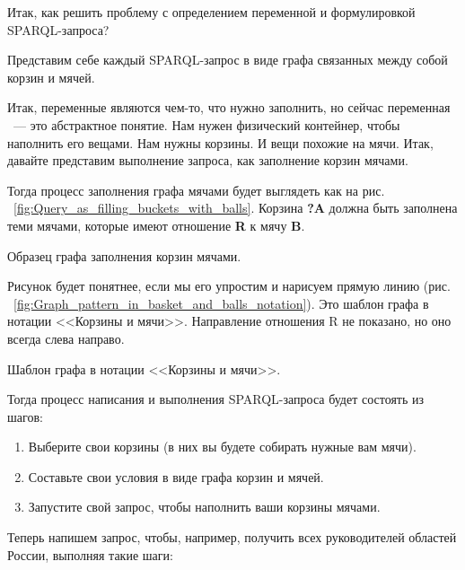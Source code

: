 Итак, как решить проблему с определением переменной и формулировкой SPARQL-запроса?

Представим себе каждый SPARQL-запрос в виде графа связанных между собой корзин и мячей.

Итак, переменные являются чем-то, что нужно заполнить, но сейчас переменная ~--- это абстрактное понятие. Нам нужен физический контейнер, чтобы наполнить его вещами. Нам нужны корзины. И вещи похожие на мячи. Итак, давайте представим выполнение запроса, как заполнение корзин мячами.

Тогда процесс заполнения графа мячами будет выглядеть как на рис. ~\ref{fig:Query_as_filling_buckets_with_balls}. Корзина \textbf{?A} должна быть заполнена теми мячами, которые имеют отношение \textbf{R} к мячу \textbf{B}.

\begin{marginfigure}[-3.5cm]
	{
		\setlength{\fboxsep}{0pt}%
		\setlength{\fboxrule}{1pt}%
	}
    \caption{Образец графа заполнения корзин мячами.}
	\label{fig:Query_as_filling_buckets_with_balls}
\end{marginfigure}

Рисунок будет понятнее, если мы его упростим и нарисуем прямую линию (рис. ~\ref{fig:Graph_pattern_in_basket_and_balls_notation}). Это шаблон графа в нотации <<Корзины и мячи>>. Направление отношения R не показано, но оно всегда слева направо.

\begin{marginfigure}[1.0cm]
	{
		\setlength{\fboxsep}{0pt}%
		\setlength{\fboxrule}{1pt}%
	}
    \caption{Шаблон графа в нотации <<Корзины и мячи>>.}
	\label{fig:Graph_pattern_in_basket_and_balls_notation}
\end{marginfigure}


Тогда процесс написания и выполнения SPARQL-запроса будет состоять из шагов:
\begin{enumerate}
    \item Выберите свои корзины (в них вы будете собирать нужные вам мячи).
    \item Составьте свои условия в виде графа корзин и мячей.
    \item Запустите свой запрос, чтобы наполнить ваши корзины мячами.
\end{enumerate}

Теперь напишем запрос, чтобы, например, получить всех руководителей областей России, выполняя такие шаги:

